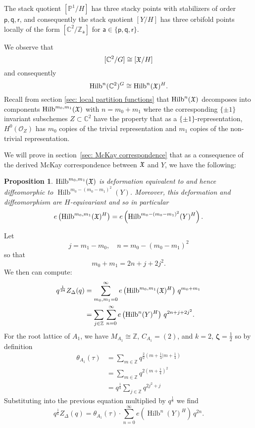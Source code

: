 \documentclass{article}
\newtheorem{proposition}[theorem]{Proposition}
\theoremstyle{definition}
\newcommand{\CC} {{\mathbb C}}          %
\newcommand{\ZZ} {{\mathbb Z}}		%
\newcommand{\PP}{\mathbb{P}}
\newcommand{\X}{\frak{X}}
\renewcommand{\O}{\mathcal{O}}
\newcommand{\varp}{\mathsf{p}}
\newcommand{\varq}{\mathsf{q}}
\newcommand{\varr}{\mathsf{r}}
\newcommand{\vara}{\mathsf{a}}
\newcommand{\zetavec}{\bm{\zeta }}
\newcommand{\Hilb}{\operatorname{Hilb}}
\begin{document}
The stack quotient $[\PP^{1}/H]$ has three stacky points with
stabilizers of order $\varp ,\varq ,\varr$, and consequently the stack
quotient $[Y/H]$ has three orbifold points locally of the form
$[\CC^{2}/\ZZ_{\vara }]$ for $\vara \in \{\varp ,\varq ,\varr \}$.


We observe that 
\[
 [\CC^{2}/G ] \cong [\X /H ]
\]
and consequently
\[
\Hilb^{n}(\CC^{2})^{G}  \cong \Hilb^{n}(\X )^{H} .
\]
Recall from section \ref{sec: local partition functions} that $
\Hilb^{n}(\X )$ decomposes into components $\Hilb^{m_{0},m_{1}}(\X )$
with $n=m_{0}+m_{1}$ where the corresponding $\{\pm 1 \}$ invariant
subschemes $Z\subset \CC^{2}$ have the property that as a $\{\pm 1
\}$-representation, $H^{0}(\O_{Z})$ has $m_{0}$ copies of the trivial
representation and $m_{1}$ copies of the non-trivial representation.

We will prove in section~\ref{sec: McKay correspondence} that as a
consequence of the derived McKay correspondence between $\X$ and $Y$,
we have the following:
\begin{proposition}\label{prop: Hilb(X,m0,m1) = Hilb(Y,m0-(m0-m1)^2)}
$\Hilb^{m_{0},m_{1}}(\X )$ is deformation equivalent to and hence
diffeomorphic to $\Hilb^{m_{0}-(m_{0}-m_{1})^{2}}(Y)$. Moreover, this
deformation and diffeomorphism are $H$-equivariant and so in
particular
\[
e\left(\Hilb^{m_{0},m_{1}}(\X )^{H} \right)
=e\left(\Hilb^{m_{0}-(m_{0}-m_{1})^{2}}(Y)^{H} \right). 
\]
\end{proposition}

Let
\[
j=m_{1}-m_{0}, \quad n=m_{0}-(m_{0}-m_{1})^{2} 
\]
so that
\[
m_{0}+m_{1} = 2n +j + 2j^{2}. 
\]
We then can compute:
\begin{align*}
q^{\frac{1}{24}} Z_{\Delta}(q) &= \sum_{m_{0},m_{1}= 0}^{\infty } 
e\left(\Hilb^{m_{0},m_{1}}(\X )^{H} \right) \, q^{m_{0}+m_{1}} \\
&= \sum_{j\in \ZZ}\,  \sum_{n=0}^{\infty} e\left(\Hilb^{n}(Y)^{H}
\right)\, q^{2n+j+2j^{2}}.
\end{align*}
For the root lattice of $A_{1}$, we have $M_{A_{1}}\cong \ZZ$,  $C_{A_{1}}=(2)$, and $k=2$,
$\zetavec =\frac{1}{2}$ so by definition
\begin{align*}
\theta_{A_{1}}(\tau ) &= \sum_{m\in \ZZ}
q^{\frac{2}{2}\left(m+\frac{1}{4}|m+\frac{1}{4} \right)} \\
&=\sum_{m\in \ZZ} q^{2(m+\frac{1}{4})^{2}} \\
&=q^{\frac{1}{8}} \sum_{j\in \ZZ} q^{2j^{2}+j}
\end{align*}
Substituting into the previous equation multiplied by
$q^{\frac{1}{8}}$ we find
\[
q^{\frac{1}{6}} Z_{\Delta}(q) = \theta_{A_{1}}(\tau ) \cdot
\sum_{n=0}^{\infty}  e\left(\Hilb^{n}(Y)^{H}
\right)\, q^{2n}.
\]
\end{document}
